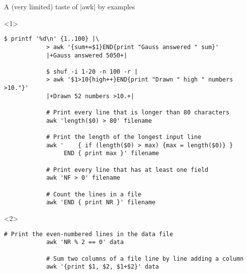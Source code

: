\begin{frame}[fragile]{A (very limited) taste of \bash|awk| by examples}
    \vspace{-1mm}
    \begin{onlyenv}<1>
        \begin{lstlisting}[style=MyBash, numbers=none, xleftmargin=3mm, xrightmargin=3mm]
            $ printf '%d\n' {1..100} |\
            > awk '{sum+=$1}END{print "Gauss answered " sum}'
            |+Gauss answered 5050+|

            $ shuf -i 1-20 -n 100 -r |
            > awk '$1>10{high++}END{print "Drawn " high " numbers >10."}'
            |+Drawn 52 numbers >10.+|

            # Print every line that is longer than 80 characters
            awk 'length($0) > 80' filename

            # Print the length of the longest input line
            awk '    { if (length($0) > max) {max = length($0)} }
                 END { print max }' filename

            # Print every line that has at least one field
            awk 'NF > 0' filename

            # Count the lines in a file
            awk 'END { print NR }' filename
        \end{lstlisting}
    \end{onlyenv}
    \begin{onlyenv}<2>
        \begin{lstlisting}[style=MyBash, numbers=none, xleftmargin=3mm, xrightmargin=3mm, belowskip=-3mm]
            # Print the even-numbered lines in the data file
            awk 'NR % 2 == 0' data

            # Sum two columns of a file line by line adding a column
            awk '{print $1, $2, $1+$2}' data


\end{lstlisting}
\end{onlyenv}
\end{frame}
